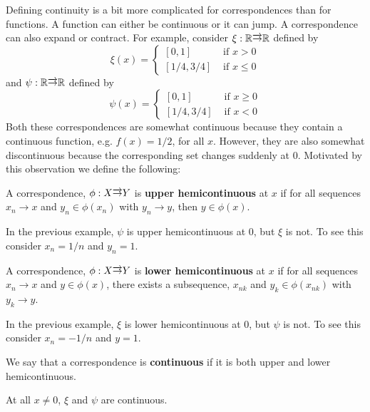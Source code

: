Defining continuity is a bit more complicated for correspondences than
for functions. A function can either be continuous or it can jump. A
correspondence can also expand or contract. For example, consider
$\xi:\mathbb{R} \overrightarrow{\rightarrow} \mathbb{R}$ defined by 
\[ \xi(x) = \begin{cases} 
  [0,1] & \text{ if } x > 0 \\
  [1/4,3/4] & \text{ if } x \leq 0 
\end{cases} \]
and $\psi: \mathbb{R} \overrightarrow{\rightarrow} \mathbb{R}$ defined by
\[ \psi(x) = \begin{cases} 
  [0,1] & \text{ if } x \geq 0 \\
  [1/4,3/4] & \text{ if } x < 0 
\end{cases} \]
Both these correspondences are somewhat continuous because they
contain a continuous function, e.g. $f(x) = 1/2$,  for all
$x$. However, they are also somewhat discontinuous because the
corresponding set changes suddenly at $0$. Motivated by this
observation we define the following:
\begin{definition}
  A correspondence, $\phi: X \overrightarrow{\rightarrow} Y$ is \textbf{upper
    hemicontinuous} at $x$ if for all sequences $x_n \to x$ and $y_n
  \in \phi(x_n)$ with $y_n \to y$, then $y \in \phi(x)$.
\end{definition}
In the previous example, $\psi$ is upper hemicontinuous at $0$, but
$\xi$ is not. To see this consider $x_n = 1/n$ and $y_n = 1$.
\begin{definition}
  A correspondence, $\phi: X \overrightarrow{\rightarrow} Y$ is \textbf{lower
    hemicontinuous} at $x$ if for all sequences $x_n \to x$ and $y \in
  \phi(x)$, there exists a subsequence, $x_{nk}$ and $y_k \in
  \phi(x_{nk})$ with $y_k \to y$.
\end{definition}
In the previous example, $\xi$ is lower hemicontinuous at $0$, but
$\psi$ is not. To see this consider $x_n = -1/n$ and $y = 1$. 
\begin{definition}
  We say that a correspondence is \textbf{continuous} if it is both
  upper and lower hemicontinuous.
\end{definition}
At all $x \neq 0$, $\xi$ and $\psi$ are continuous.






